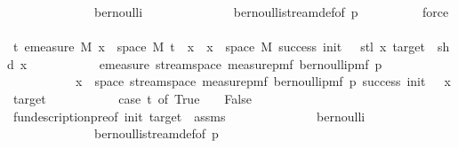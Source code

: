 \begin{isabellebody}
\ \ \ \ \ \ \ \ \ \ \ \ \ \ bernoulli\isanewline
\ \ \ \ \ \ \ \ \ \ \ \ \ \ bernoulli{\isacharunderscore}{\kern0pt}stream{\isacharunderscore}{\kern0pt}def{\isacharbrackleft}{\kern0pt}of\ p{\isacharbrackright}{\kern0pt}\isanewline
\ \ \ \ \ \ \ \ \isamarkupfalse%
\ force\isanewline
\ \ \ \ \ \ \isamarkupfalse%
\ \isamarkupfalse%
\ {\isachardoublequoteopen}{\isacharparenleft}{\kern0pt}{\isasymAnd}t{\isachardot}{\kern0pt}\ emeasure\ M\ {\isacharbraceleft}{\kern0pt}x\ {\isasymin}\ space\ M{\isachardot}{\kern0pt}\ t\ {\isacharhash}{\kern0pt}{\isacharhash}{\kern0pt}\ x\ {\isasymin}\ {\isacharbraceleft}{\kern0pt}x\ {\isasymin}\ space\ M{\isachardot}{\kern0pt}\ success\ {\isacharparenleft}{\kern0pt}init\ {\isacharplus}{\kern0pt}\ {}{\isacharparenright}{\kern0pt}\ {\isacharparenleft}{\kern0pt}stl\ x{\isacharparenright}{\kern0pt}\ target\ {\isasymand}\ shd\ x{\isacharbraceright}{\kern0pt}{\isacharbraceright}{\kern0pt}\ {\isacharequal}{\kern0pt}\isanewline
\ \ \ \ \ \ \ \ \ \ emeasure\ {\isacharparenleft}{\kern0pt}stream{\isacharunderscore}{\kern0pt}space\ {\isacharparenleft}{\kern0pt}measure{\isacharunderscore}{\kern0pt}pmf\ {\isacharparenleft}{\kern0pt}bernoulli{\isacharunderscore}{\kern0pt}pmf\ p{\isacharparenright}{\kern0pt}{\isacharparenright}{\kern0pt}{\isacharparenright}{\kern0pt}\isanewline
\ \ \ \ \ \ \ \ \ \ \ {\isacharbraceleft}{\kern0pt}x\ {\isasymin}\ space\ {\isacharparenleft}{\kern0pt}stream{\isacharunderscore}{\kern0pt}space\ {\isacharparenleft}{\kern0pt}measure{\isacharunderscore}{\kern0pt}pmf\ {\isacharparenleft}{\kern0pt}bernoulli{\isacharunderscore}{\kern0pt}pmf\ p{\isacharparenright}{\kern0pt}{\isacharparenright}{\kern0pt}{\isacharparenright}{\kern0pt}{\isachardot}{\kern0pt}\ success\ {\isacharparenleft}{\kern0pt}init\ {\isacharplus}{\kern0pt}\ {}{\isacharparenright}{\kern0pt}\ x\ target{\isacharbraceright}{\kern0pt}\ {\isacharasterisk}{\kern0pt}\isanewline
\ \ \ \ \ \ \ \ \ \ {\isacharparenleft}{\kern0pt}case\ t\ of\ True\ {\isasymRightarrow}\ {}\ {\isacharbar}{\kern0pt}\ False\ {\isasymRightarrow}\ {}{\isacharparenright}{\kern0pt}{\isacharparenright}{\kern0pt}{\isachardoublequoteclose}\isanewline
\ \ \ \ \ \ \ \ \isamarkupfalse%
\ fun{\isacharunderscore}{\kern0pt}description{\isacharunderscore}{\kern0pt}pre{\isacharbrackleft}{\kern0pt}of\ init\ target\ {\isacharunderscore}{\kern0pt}{\isacharbrackright}{\kern0pt}\ assms\isanewline
\ \ \ \ \ \ \ \ \ \ \ \ \ \ bernoulli\isanewline
\ \ \ \ \ \ \ \ \ \ \ \ \ \ bernoulli{\isacharunderscore}{\kern0pt}stream{\isacharunderscore}{\kern0pt}def{\isacharbrackleft}{\kern0pt}of\ p{\isacharbrackright}{\kern0pt}\isanewline

\end{isabellebody}
